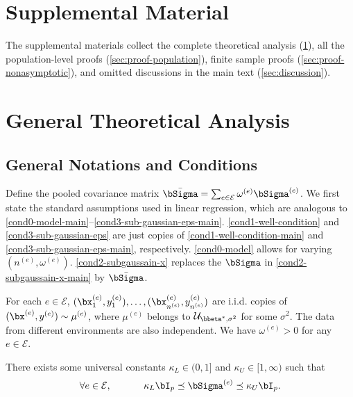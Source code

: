 \documentclass[10pt]{article}
\numberwithin{equation}{section}
\begin{document}
\appendix

\section*{Supplemental Material}

The supplemental materials collect the complete theoretical analysis (\cref{sec:theory:general}), all the population-level proofs (\cref{sec:proof-population}), finite sample proofs (\cref{sec:proof-nonasymptotic}), and omitted discussions in the main text (\cref{sec:discussion}).



\section{General Theoretical Analysis}

\label{sec:theory:general}

\subsection{General Notations and Conditions}


Define the pooled covariance matrix $\bar{\bSigma} = \sum_{e\in \mathcal{E}} \omega^{(e)} \bSigma^{(e)}$. We first state the standard assumptions used in linear regression, which are analogous to \cref{cond0-model-main}--\ref{cond3-sub-gaussian-eps-main}. \cref{cond1-well-condition} and \cref{cond3-sub-gaussian-eps} are just copies of \cref{cond1-well-condition-main} and \cref{cond3-sub-gaussian-eps-main}, respectively. \cref{cond0-model} allows for varying $(n^{(e)}, \omega^{(e)})$. \cref{cond2-subgaussain-x} replaces the $\bSigma$ in \cref{cond2-subgaussain-x-main} by $\bar{\bSigma}$.

\begin{condition}
\label{cond0-model}
	For each $e\in \mathcal{E}$, $(\bx_1^{(e)}, y_1^{(e)}), \ldots, (\bx_{n^{(e)}}^{(e)}, y_{n^{(e)}}^{(e)})$ are i.i.d. copies of $(\bx^{(e)}, y^{(e)}) \sim \mu^{(e)}$, where $\mu^{(e)}$ belongs to $\mathcal{U}_{\bbeta^*, \sigma^2}$ for some $\sigma^2$. The data from different environments are also independent. We have $\omega^{(e)} > 0$ for any $e\in \mathcal{E}$. 
\end{condition}

\begin{condition}
\label{cond1-well-condition}
	There exists some universal constants $\kappa_L \in (0,1]$ and $\kappa_U \in [1,\infty)$ such that
	\begin{align}
		\forall e\in \mathcal{E}, ~~~~~~~~~~ \kappa_L \bI_p \preceq \bSigma^{(e)} \preceq \kappa_U \bI_p.
	\end{align}
\end{condition}
\end{document}
